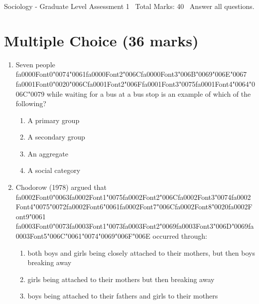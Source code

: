 \documentclass[12pt]{article}
\begin{document}
\begin{center}
Sociology - Graduate Level Assessment 1 \
Total Marks: 40 \
Answer all questions.
\end{center}

\section*{Multiple Choice (36 marks)}
\begin{enumerate}[label=\arabic*.]
\item Seven people {\csname fa0000Font0\endcsname\char"0074}{\char"0061}{\csname fa0000Font2\endcsname\char"006C}{\csname fa0000Font3\endcsname\char"006B}{\char"0069}{\char"006E}{\char"0067} {\csname fa0001Font0\endcsname\char"0020}{\char"006C}{\csname fa0001Font2\endcsname\char"006F}{\csname fa0001Font3\endcsname\char"0075}{\csname fa0001Font4\endcsname\char"0064}{\char"006C}{\char"0079} while waiting for a bus at a bus stop is an example of which of the following?
\begin{enumerate}[label=(\alph*)]
    \item A primary group
    \item A secondary group
    \item An aggregate
    \item A social category
\end{enumerate}
\item Chodorow (1978) argued that {\csname fa0002Font0\endcsname\char"0063}{\csname fa0002Font1\endcsname\char"0075}{\csname fa0002Font2\endcsname\char"006C}{\csname fa0002Font3\endcsname\char"0074}{\csname fa0002Font4\endcsname\char"0075}{\char"0072}{\csname fa0002Font6\endcsname\char"0061}{\csname fa0002Font7\endcsname\char"006C}{\csname fa0002Font8\endcsname\char"0020}{\csname fa0002Font9\endcsname\char"0061} {\csname fa0003Font0\endcsname\char"0073}{\csname fa0003Font1\endcsname\char"0073}{\csname fa0003Font2\endcsname\char"0069}{\csname fa0003Font3\endcsname\char"006D}{\char"0069}{\csname fa0003Font5\endcsname\char"006C}{\char"0061}{\char"0074}{\char"0069}{\char"006F}{\char"006E} occurred through:
\begin{enumerate}[label=(\alph*)]
    \item both boys and girls being closely attached to their mothers, but then boys breaking away
    \item girls being attached to their mothers but then breaking away
    \item boys being attached to their fathers and girls to their mothers

\end{enumerate}
\end{enumerate}
\end{document}
